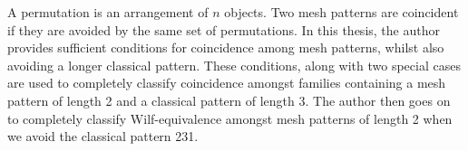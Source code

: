 A permutation is an arrangement of \(n\) objects.
Two mesh patterns are coincident if they are avoided by the same set of
permutations. In this thesis, the author provides sufficient conditions for
coincidence among mesh patterns, whilst also avoiding a longer classical
pattern. These conditions, along with two special cases are used to completely
classify coincidence amongst families containing a mesh pattern of length 2
and a classical pattern of length 3. The author then goes on to completely
classify Wilf-equivalence amongst mesh patterns of length 2 when we avoid the
classical pattern 231.
